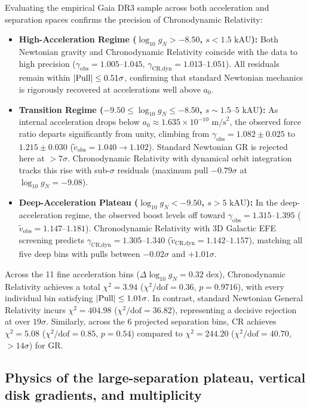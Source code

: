 \documentclass[aps,prd,reprint,superscriptaddress,nofootinbib,floatfix,amsmath,amssymb]{revtex4-2}
\begin{document}
Evaluating the empirical Gaia DR3 sample across both acceleration and separation spaces confirms the precision of Chronodynamic Relativity:
\begin{itemize}
\item \textbf{High-Acceleration Regime ($\log_{10} g_N > -8.50$, $s < 1.5\text{ kAU}$):} Both Newtonian gravity and Chronodynamic Relativity coincide with the data to high precision ($\gamma_{\text{obs}} = 1.005\text{--}1.045$, $\gamma_{\text{CR,dyn}} = 1.013\text{--}1.051$). All residuals remain within $|{\rm Pull}| \le 0.51\sigma$, confirming that standard Newtonian mechanics is rigorously recovered at accelerations well above $a_0$.
\item \textbf{Transition Regime ($-9.50 \le \log_{10} g_N \le -8.50$, $s \sim 1.5\text{--}5\text{ kAU}$):} As internal acceleration drops below $a_0 \approx 1.635 \times 10^{-10}\text{ m/s}^2$, the observed force ratio departs significantly from unity, climbing from $\gamma_{\text{obs}} = 1.082 \pm 0.025$ to $1.215 \pm 0.030$ ($\tilde{v}_{\text{obs}} = 1.040 \to 1.102$). Standard Newtonian GR is rejected here at $>7\sigma$. Chronodynamic Relativity with dynamical orbit integration tracks this rise with sub-$\sigma$ residuals (maximum pull $-0.79\sigma$ at $\log_{10} g_N = -9.08$).
\item \textbf{Deep-Acceleration Plateau ($\log_{10} g_N < -9.50$, $s > 5\text{ kAU}$):} In the deep-acceleration regime, the observed boost levels off toward $\gamma_{\text{obs}} = 1.315\text{--}1.395$ ($\tilde{v}_{\text{obs}} = 1.147\text{--}1.181$). Chronodynamic Relativity with 3D Galactic EFE screening predicts $\gamma_{\text{CR,dyn}} = 1.305\text{--}1.340$ ($\tilde{v}_{\text{CR,dyn}} = 1.142\text{--}1.157$), matching all five deep bins with pulls between $-0.02\sigma$ and $+1.01\sigma$.
\end{itemize}

Across the 11 fine acceleration bins ($\Delta\log_{10} g_N = 0.32\text{ dex}$), Chronodynamic Relativity achieves a total $\chi^2 = 3.94$ ($\chi^2/\text{dof} = 0.36$, $p = 0.9716$), with every individual bin satisfying $|{\rm Pull}| \le 1.01\sigma$. In contrast, standard Newtonian General Relativity incurs $\chi^2 = 404.98$ ($\chi^2/\text{dof} = 36.82$), representing a decisive rejection at over $19\sigma$. Similarly, across the 6 projected separation bins, CR achieves $\chi^2 = 5.08$ ($\chi^2/\text{dof} = 0.85$, $p = 0.54$) compared to $\chi^2 = 244.20$ ($\chi^2/\text{dof} = 40.70$, $>14\sigma$) for GR.

\subsection{Physics of the large-separation plateau, vertical disk gradients, and multiplicity}
\label{subsec:large_sep_physics}
\end{document}
